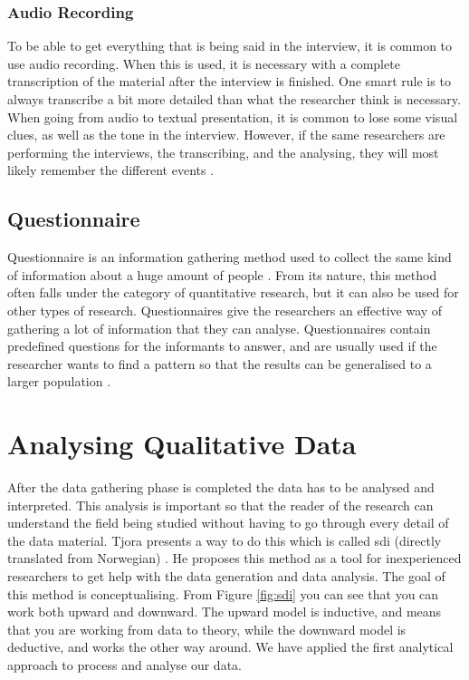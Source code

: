 \subsubsection{Audio Recording}
To be able to get everything that is being said in the interview, it is common to use audio recording. When this is used, it is necessary with a complete transcription of the material after the interview is finished. One smart rule is to always transcribe a bit more detailed than what the researcher think is necessary. When going from audio to textual presentation, it is common to lose some visual clues, as well as the tone in the interview. However, if the same researchers are performing the interviews, the transcribing, and the analysing, they will most likely remember the different events \cite{tjora}. 

\subsection{Questionnaire}
Questionnaire is an information gathering method used to collect  the same kind of information about a huge amount of people \cite{oates}. From its nature, this method often falls under the category of quantitative research, but it can also be used for other types of research. Questionnaires give the researchers an effective way of gathering a lot of information that they can analyse. Questionnaires contain predefined questions for the informants to answer, and are usually used if the researcher wants to find a pattern so that the results can be generalised to a larger population  \cite{oates}. 

\section{Analysing Qualitative Data}
\label{sec:analysingdata}
After the data gathering phase is completed the data has to be analysed and interpreted. This analysis is important so that the reader of the research can understand the field being studied without having to go through every detail of the data material. Tjora presents a way to do this which is called \ac{sdi} (directly translated from Norwegian) \cite{tjora}. He proposes this method as a tool for inexperienced researchers to get help with the data generation and data analysis. The goal of this method is conceptualising. From Figure \ref{fig:sdi} you can see that you can work both upward and downward. The upward model is inductive, and means that you are working from data to theory, while the downward model is deductive, and works the other way around. We have applied the first analytical approach to process and analyse our data.

